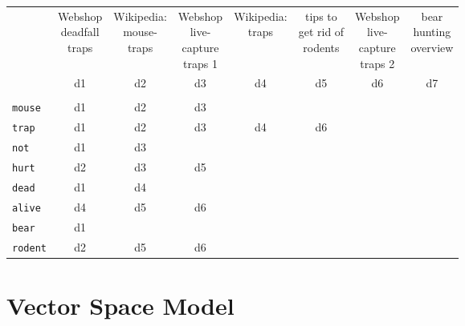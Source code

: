             	\begin{table}[H]
            		\centering
            		\begin{tabular}{|l|c|c|c|c|c|c|c|}
            			\cline{2-8}
        				\multicolumn{1}{c|}{} & \makecell{Webshop \\ deadfall \\ traps} & \makecell{Wikipedia: \\ mouse- \\ traps} & \makecell{Webshop \\ live- \\ capture \\ traps 1} & \makecell{Wikipedia: \\ traps} & \makecell{tips to \\ get rid of \\ rodents} & \makecell{Webshop \\ live- \\ capture \\ traps 2} & \makecell{bear \\ hunting \\ overview} \\ \cline{2-8}
        				\multicolumn{1}{c|}{} & d1 & d2 & d3 & d4 & d5 & d6 & d7 \\ \cline{2-8}
        				\multicolumn{8}{c}{} \\ \cline{1-4}
            			\texttt{mouse} & d1 & d2 & d3 & \multicolumn{4}{c}{} \\ \cline{1-6}
						\texttt{trap} & d1 & d2 & d3 & d4 & d6 & \multicolumn{2}{c}{} \\ \cline{1-6}
						\texttt{not} & d1 & d3 & \multicolumn{5}{c}{} \\ \cline{1-4}
						\texttt{hurt} & d2 & d3 & d5 & \multicolumn{4}{c}{} \\ \cline{1-4}
						\texttt{dead} & d1 & d4 & \multicolumn{5}{c}{} \\ \cline{1-4}
						\texttt{alive} & d4 & d5 & d6 & \multicolumn{4}{c}{} \\ \cline{1-4}
						\texttt{bear} & d1 & \multicolumn{6}{c}{} \\ \cline{1-4}
						\texttt{rodent} & d2 & d5 & d6 & \multicolumn{4}{c}{} \\ \cline{1-4}
            		\end{tabular}
            	\end{table}

    \section{Vector Space Model} %
